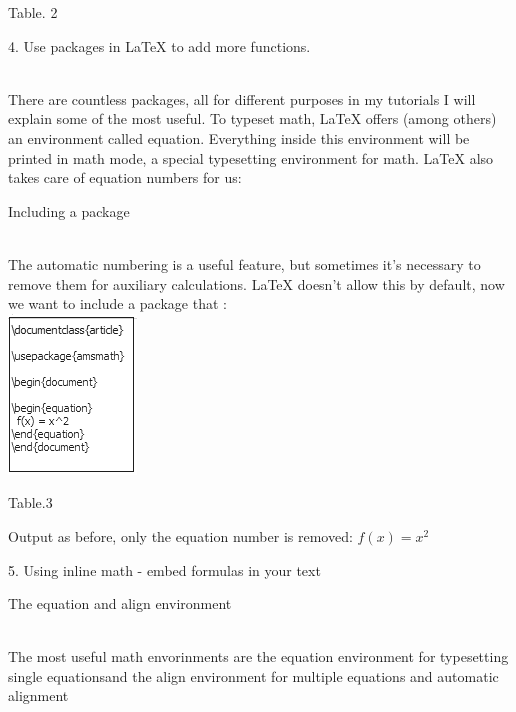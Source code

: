 \documentclass[onecolumn,journal] {IEEEtran}
\begin{document}
\begin{flushleft}
\begin{center}
\begin{tabular}{ |c| }
\end{tabular}
\end{center} 

\begin{center}
Table. 2
\end{center}
\end{flushleft}

\begin{Large}
4. Use packages in LaTeX to add more functions. 
\end{Large} \\

There are countless packages, all for different purposes in my tutorials I will explain some of the most useful. To typeset math, LaTeX offers (among others) an environment called equation. Everything inside this environment will be printed in math mode, a special typesetting environment for math. LaTeX also takes care of equation numbers for us: \\
\begin{Large}
\newline
Including a package\\
\end{Large} \\
The automatic numbering is a useful feature, but sometimes it's necessary to remove them for auxiliary calculations. LaTeX doesn't allow this by default, now we want to include a package that :\\

\center
  \includegraphics[width=4 cm]{uespack1.png}

\begin{center}
Table.3
\end{center}
\begin{flushleft}
Output as before, only the equation number is removed: $f(x) = x^2$ 
\newline
\newline
\begin{Large}
5. Using inline math - embed formulas in your text
\newline

The equation and align environment 
\end{Large} \\
The most useful math envorinments are the equation environment for typesetting single equationsand the align environment for multiple equations and automatic alignment
\end{flushleft}
\end{document}
